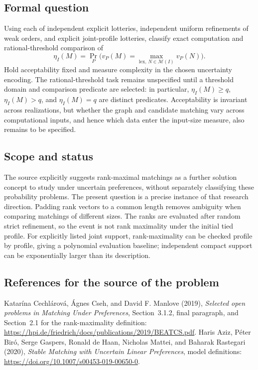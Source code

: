 \documentclass[11pt,a4paper]{article}
\begin{document}
\subsection*{Formal question}
Using each of independent explicit lotteries, independent uniform refinements of weak orders, and explicit joint-profile lotteries, classify exact computation and rational-threshold comparison of
\[
 \eta_I(M)=\Pr_P\bigl(v_P(M)=\max_{\mathrm{lex},\,N\in\mathcal M(I)}v_P(N)\bigr).
\]
Hold acceptability fixed and measure complexity in the chosen uncertainty encoding. The rational-threshold task remains unspecified until a threshold domain and comparison predicate are selected: in particular, $\eta_I(M)\geq q$, $\eta_I(M)>q$, and $\eta_I(M)=q$ are distinct predicates. Acceptability is invariant across realizations, but whether the graph and candidate matching vary across computational inputs, and hence which data enter the input-size measure, also remains to be specified.
\subsection*{Scope and status}
The source explicitly suggests rank-maximal matchings as a further solution concept to study under uncertain preferences, without separately classifying these probability problems. The present question is a precise instance of that research direction. Padding rank vectors to a common length removes ambiguity when comparing matchings of different sizes. The ranks are evaluated after random strict refinement, so the event is not rank maximality under the initial tied profile. For explicitly listed joint support, rank-maximality can be checked profile by profile, giving a polynomial evaluation baseline; independent compact support can be exponentially larger than its description.
\subsection*{References for the source of the problem}
Katar\'ina Cechl\'arov\'a, \'Agnes Cseh, and David F. Manlove (2019), \emph{Selected open problems in Matching Under Preferences}, Section~3.1.2, final paragraph, and Section~2.1 for the rank-maximality definition: \url{https://hpi.de/friedrich/docs/publications/2019/BEATCS.pdf}. Haris Aziz, P\'eter Bir\'o, Serge Gaspers, Ronald de Haan, Nicholas Mattei, and Baharak Rastegari (2020), \emph{Stable Matching with Uncertain Linear Preferences}, model definitions: \url{https://doi.org/10.1007/s00453-019-00650-0}.
\end{document}
